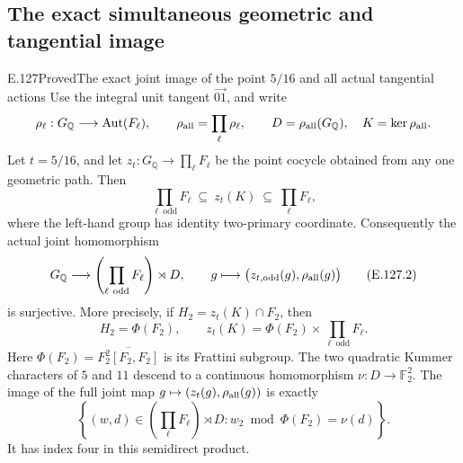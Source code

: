 \subsection{The exact simultaneous geometric and tangential image}

\begin{result}{E.127}{Proved}{The exact joint image of the point $5/16$ and all actual tangential actions}
Use the integral unit tangent $\overrightarrow{01}$, and write
\[
 \rho_\ell:G_{\mathbb Q}\longrightarrow\operatorname{Aut}(F_\ell),
 \qquad
 \rho_{\rm all}=\prod_\ell\rho_\ell,
 \qquad D=\rho_{\rm all}(G_{\mathbb Q}),\quad K=\ker\rho_{\rm all}.
\]
Let $t=5/16$, and let
$z_t:G_{\mathbb Q}\to\prod_\ell F_\ell$
be the point cocycle obtained from any one geometric path.
Then
\[
 \prod_{\ell\ \mathrm{odd}}F_\ell
        \ \subseteq\ z_t(K)\ \subseteq\ \prod_\ell F_\ell,
                                                        \tag{E.127.1}
\]
where the left-hand group has identity two-primary coordinate.
Consequently the actual joint homomorphism
\[
 G_{\mathbb Q}\longrightarrow
       \left(\prod_{\ell\ \mathrm{odd}}F_\ell\right)\rtimes D,
 \qquad g\longmapsto\bigl(z_{t,\mathrm{odd}}(g),\rho_{\rm all}(g)\bigr)
                                                        \tag{E.127.2}
\]
is surjective.  More precisely, if $H_2=z_t(K)\cap F_2$, then
\[
 H_2=\Phi(F_2),\qquad
 z_t(K)=\Phi(F_2)\times\prod_{\ell\ \mathrm{odd}}F_\ell.
                                                        \tag{E.127.3}
\]
Here $\Phi(F_2)=\overline{F_2^2[F_2,F_2]}$ is its
Frattini subgroup.  The two quadratic Kummer characters of
$5$ and $11$ descend to a continuous homomorphism
$\nu:D\to\mathbb F_2^2$.  The image of the full joint map
$g\mapsto(z_t(g),\rho_{\rm all}(g))$ is exactly
\[
 \left\{(w,d)\in\left(\prod_\ell F_\ell\right)\rtimes D:
          w_2\bmod\Phi(F_2)=\nu(d)\right\}.
                                                        \tag{E.127.4}
\]
It has index four in this semidirect product.
\end{result}
